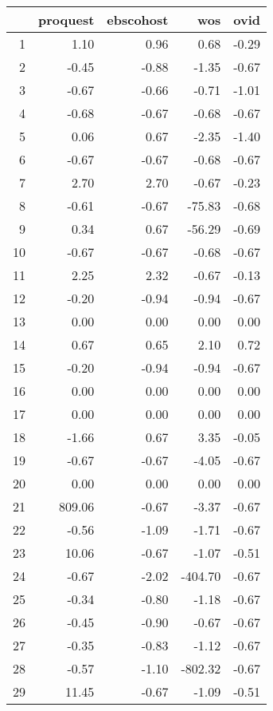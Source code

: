 \begin{table}[ht]
\centering
\begin{tabular}{rrrrr}
  \hline
 & proquest & ebscohost & wos & ovid \\ 
  \hline
1 & 1.10 & 0.96 & 0.68 & -0.29 \\ 
  2 & -0.45 & -0.88 & -1.35 & -0.67 \\ 
  3 & -0.67 & -0.66 & -0.71 & -1.01 \\ 
  4 & -0.68 & -0.67 & -0.68 & -0.67 \\ 
  5 & 0.06 & 0.67 & -2.35 & -1.40 \\ 
  6 & -0.67 & -0.67 & -0.68 & -0.67 \\ 
  7 & 2.70 & 2.70 & -0.67 & -0.23 \\ 
  8 & -0.61 & -0.67 & -75.83 & -0.68 \\ 
  9 & 0.34 & 0.67 & -56.29 & -0.69 \\ 
  10 & -0.67 & -0.67 & -0.68 & -0.67 \\ 
  11 & 2.25 & 2.32 & -0.67 & -0.13 \\ 
  12 & -0.20 & -0.94 & -0.94 & -0.67 \\ 
  13 & 0.00 & 0.00 & 0.00 & 0.00 \\ 
  14 & 0.67 & 0.65 & 2.10 & 0.72 \\ 
  15 & -0.20 & -0.94 & -0.94 & -0.67 \\ 
  16 & 0.00 & 0.00 & 0.00 & 0.00 \\ 
  17 & 0.00 & 0.00 & 0.00 & 0.00 \\ 
  18 & -1.66 & 0.67 & 3.35 & -0.05 \\ 
  19 & -0.67 & -0.67 & -4.05 & -0.67 \\ 
  20 & 0.00 & 0.00 & 0.00 & 0.00 \\ 
  21 & 809.06 & -0.67 & -3.37 & -0.67 \\ 
  22 & -0.56 & -1.09 & -1.71 & -0.67 \\ 
  23 & 10.06 & -0.67 & -1.07 & -0.51 \\ 
  24 & -0.67 & -2.02 & -404.70 & -0.67 \\ 
  25 & -0.34 & -0.80 & -1.18 & -0.67 \\ 
  26 & -0.45 & -0.90 & -0.67 & -0.67 \\ 
  27 & -0.35 & -0.83 & -1.12 & -0.67 \\ 
  28 & -0.57 & -1.10 & -802.32 & -0.67 \\ 
  29 & 11.45 & -0.67 & -1.09 & -0.51 \\ 
   \hline
\end{tabular}
\end{table}

